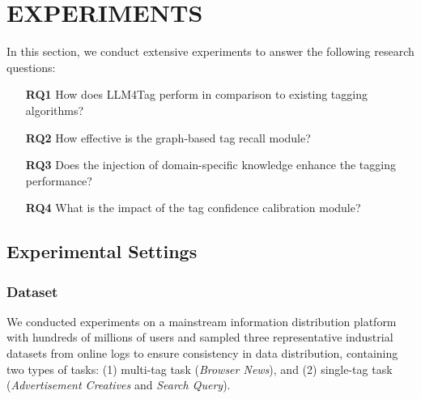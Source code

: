 \section{EXPERIMENTS}\label{sec:exp}
In this section, we conduct extensive experiments to answer the following research questions:
\begin{itemize}
    \item[\textbf{RQ1}] How does LLM4Tag perform in comparison to existing tagging algorithms?
    \item[\textbf{RQ2}] How effective is the graph-based tag recall module?
    \item[\textbf{RQ3}] Does the injection of domain-specific knowledge enhance the tagging performance?
    \item[\textbf{RQ4}] What is the impact of the tag confidence calibration module?
\end{itemize}


\subsection{Experimental Settings}
\subsubsection{Dataset}
We conducted experiments on a mainstream information distribution platform with hundreds of millions of users and sampled three representative industrial datasets  from online logs to ensure consistency in data distribution, containing two types of tasks: (1) multi-tag task (\textit{Browser News}), and (2) single-tag task (\textit{Advertisement Creatives} and \textit{Search Query}).

